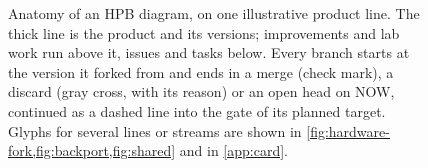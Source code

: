 \begin{figure}[t]
{\begin{hpbgraph}
\end{hpbgraph}}
\caption{Anatomy of an HPB diagram, on one illustrative product line. The
thick line is the product and its versions; improvements and lab work run
above it, issues and tasks below. Every branch starts at the version it
forked from and ends in a merge (check mark), a discard (gray cross, with its
reason) or an open head on NOW, continued as a dashed line into the gate of
its planned target. Glyphs for several lines or streams are shown in
\cref{fig:hardware-fork,fig:backport,fig:shared} and in \cref{app:card}.}
\label{fig:anatomy}
\end{figure}
